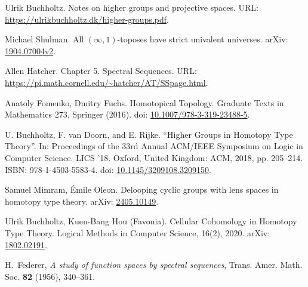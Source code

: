 \documentclass{amsart}
\theoremstyle{definition}
\begin{document}
\begin{thebibliography}{}
Ulrik Buchholtz. Notes on higher groups and projective spaces. URL:
\url{https://ulrikbuchholtz.dk/higher-groups.pdf}.

Michael Shulman. All $(\infty,1)$-toposes have strict univalent universes.
arXiv:
\href{https://arxiv.org/abs/1904.07004v2}{1904.07004v2}.

Allen Hatcher. Chapter 5. Spectral Sequences. URL:
\url{https://pi.math.cornell.edu/~hatcher/AT/SSpage.html}.

Anatoly Fomenko, Dmitry Fuchs. Homotopical Topology. Graduate Texts in Mathematics 273, Springer (2016).
doi: \href{https://doi.org/10.1007/978-3-319-23488-5}{10.1007/978-3-319-23488-5}.

U. Buchholtz, F. van Doorn, and E. Rijke. ``Higher Groups in Homotopy
Type Theory''. In: Proceedings of the 33rd Annual ACM/IEEE Symposium on
Logic in Computer Science. LICS '18. Oxford, United Kingdom: ACM, 2018,
pp. 205–214. ISBN: 978-1-4503-5583-4. doi: \href{https://dl.acm.org/doi/10.1145/3209108.3209150}{10.1145/3209108.3209150}.

Samuel Mimram, \'Emile Oleon. Delooping cyclic groups with lens spaces in homotopy type theory.
arXiv:
\href{https://arxiv.org/abs/2405.10149}{2405.10149}.

Ulrik Buchholtz, Kuen-Bang Hou (Favonia). Cellular Cohomology in Homotopy Type Theory.
Logical Methods in Computer Science, 16(2), 2020.
arXiv: \href{https://arxiv.org/abs/1802.02191}{1802.02191}.

H.~Federer,
\textit{A study of function spaces by spectral sequences},
Trans. Amer. Math. Soc. \textbf{82} (1956), 340--361.

\end{thebibliography}
\end{document}
